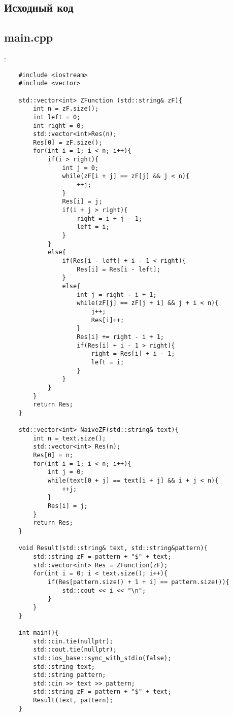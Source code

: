 \documentclass[12pt]{article}
\begin{document}
\subsection*{Исходный код}

\subsection*{main.cpp}:

\begin{lstlisting}
    #include <iostream>
    #include <vector>
    
    std::vector<int> ZFunction (std::string& zF){
        int n = zF.size();
        int left = 0;
        int right = 0;
        std::vector<int>Res(n);
        Res[0] = zF.size();
        for(int i = 1; i < n; i++){
            if(i > right){
                int j = 0;
                while(zF[i + j] == zF[j] && j < n){
                    ++j;
                }
                Res[i] = j;
                if(i + j > right){
                    right = i + j - 1;
                    left = i;
                }
            }
            else{
                if(Res[i - left] + i - 1 < right){
                    Res[i] = Res[i - left];
                }
                else{
                    int j = right - i + 1;
                    while(zF[j] == zF[j + i] && j + i < n){
                        j++;
                        Res[i]++;
                    }
                    Res[i] += right - i + 1;
                    if(Res[i] + i - 1 > right){
                        right = Res[i] + i - 1;
                        left = i;
                    }
                }
            }
        }
        return Res;
    }
    
    std::vector<int> NaiveZF(std::string& text){
        int n = text.size();
        std::vector<int> Res(n);
        Res[0] = n;
        for(int i = 1; i < n; i++){
            int j = 0;
            while(text[0 + j] == text[i + j] && i + j < n){
                ++j;
            }
            Res[i] = j;
        }
        return Res;
    }
    
    void Result(std::string& text, std::string&pattern){
        std::string zF = pattern + "$" + text;
        std::vector<int> Res = ZFunction(zF);
        for(int i = 0; i < text.size(); i++){
            if(Res[pattern.size() + 1 + i] == pattern.size()){
                std::cout << i << "\n";
            }
        }
    }
    
    int main(){
        std::cin.tie(nullptr);
        std::cout.tie(nullptr);
        std::ios_base::sync_with_stdio(false);
        std::string text;
        std::string pattern;
        std::cin >> text >> pattern;
        std::string zF = pattern + "$" + text;
        Result(text, pattern);
    }

\end{lstlisting}  
\end{document}
